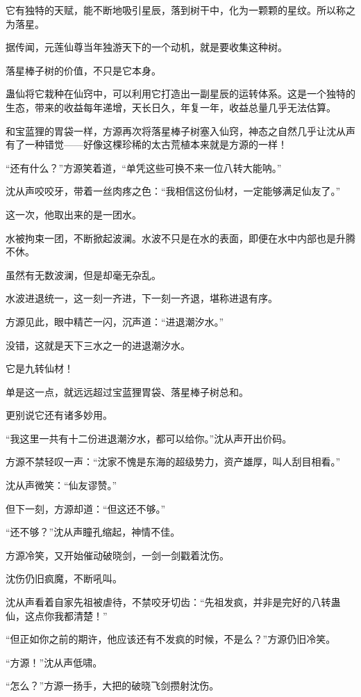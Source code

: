 \begin{this_body}
它有独特的天赋，能不断地吸引星辰，落到树干中，化为一颗颗的星纹。所以称之为落星。

据传闻，元莲仙尊当年独游天下的一个动机，就是要收集这种树。

落星棒子树的价值，不只是它本身。

蛊仙将它栽种在仙窍中，可以利用它打造出一副星辰的运转体系。这是一个独特的生态，带来的收益每年递增，天长日久，年复一年，收益总量几乎无法估算。

和宝蓝狸的胃袋一样，方源再次将落星棒子树塞入仙窍，神态之自然几乎让沈从声有了一种错觉——好像这棵珍稀的太古荒植本来就是方源的一样！

“还有什么？”方源笑着道，“单凭这些可换不来一位八转大能呐。”

沈从声咬咬牙，带着一丝肉疼之色：“我相信这份仙材，一定能够满足仙友了。”

这一次，他取出来的是一团水。

水被拘束一团，不断掀起波澜。水波不只是在水的表面，即便在水中内部也是升腾不休。

虽然有无数波澜，但是却毫无杂乱。

水波进退统一，这一刻一齐进，下一刻一齐退，堪称进退有序。

方源见此，眼中精芒一闪，沉声道：“进退潮汐水。”

没错，这就是天下三水之一的进退潮汐水。

它是九转仙材！

单是这一点，就远远超过宝蓝狸胃袋、落星棒子树总和。

更别说它还有诸多妙用。

“我这里一共有十二份进退潮汐水，都可以给你。”沈从声开出价码。

方源不禁轻叹一声：“沈家不愧是东海的超级势力，资产雄厚，叫人刮目相看。”

沈从声微笑：“仙友谬赞。”

但下一刻，方源却道：“但这还不够。”

“还不够？”沈从声瞳孔缩起，神情不佳。

方源冷笑，又开始催动破晓剑，一剑一剑戳着沈伤。

沈伤仍旧疯魔，不断吼叫。

沈从声看着自家先祖被虐待，不禁咬牙切齿：“先祖发疯，并非是完好的八转蛊仙，这点你我都清楚！”

“但正如你之前的期许，他应该还有不发疯的时候，不是么？”方源仍旧冷笑。

“方源！”沈从声低啸。

“怎么？”方源一扬手，大把的破晓飞剑攒射沈伤。


\end{this_body}
